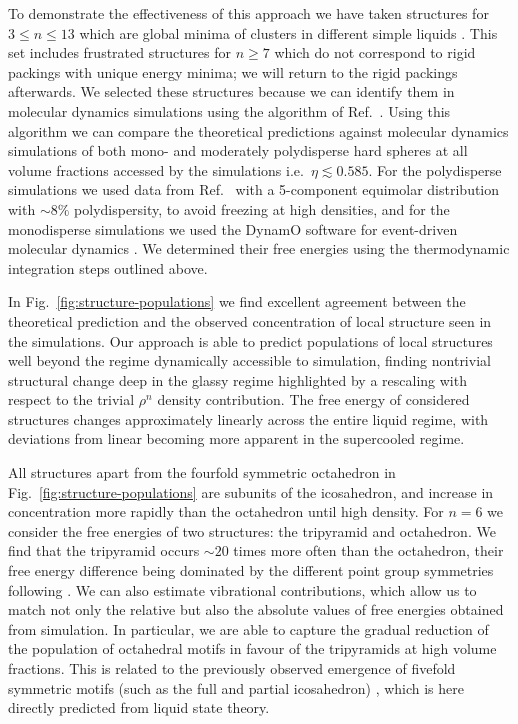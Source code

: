 \documentclass[11pt,twoside]{report}
\begin{document}
To demonstrate the effectiveness of this approach we have taken structures for $3 \le n \le 13$ which are global minima of clusters in different simple liquids \cite{Wales2004}.
This set includes frustrated structures for $n \ge 7$ which do not correspond to rigid packings with unique energy minima; we will return to the rigid packings afterwards.
We selected these structures because we can identify them in molecular dynamics simulations using the algorithm of Ref.\ \cite{MalinsTCC2013}.
Using this algorithm we can compare the theoretical predictions against molecular dynamics simulations of both mono- and moderately polydisperse hard spheres at all volume fractions accessed by the simulations i.e.\ $\eta \lesssim 0.585$.
For the polydisperse simulations we used data from Ref.\ \cite{RoyallJSM2017} with a 5-component equimolar distribution with $\sim8\%$ polydispersity, to avoid freezing at high densities, and for the monodisperse simulations we used the DynamO software for event-driven molecular dynamics \cite{BannermanJCC2011}.
We determined their free energies using the thermodynamic integration steps outlined above.

In Fig.\ \ref{fig:structure-populations} we find excellent agreement between the theoretical prediction and the observed concentration of local structure seen in the simulations.
Our approach is able to predict populations of local structures well beyond the regime dynamically accessible to simulation, finding nontrivial structural change deep in the glassy regime highlighted by a rescaling with respect to the trivial $\rho^n$ density contribution.
The free energy of considered structures changes approximately linearly across the entire liquid regime, with deviations from linear becoming more apparent in the supercooled regime.

All structures apart from the fourfold symmetric octahedron in Fig.\ \ref{fig:structure-populations} are subunits of the icosahedron, and increase in concentration more rapidly than the octahedron until high density.
For $n=6$ we consider the free energies of two structures: the tripyramid and octahedron.
We find that the tripyramid occurs $\sim20$ times more often than the octahedron, their free energy difference being dominated by the different point group symmetries following \cite{MalinsJPCM2009,MengS2010}.
We can also estimate vibrational contributions, which allow us to match not only the relative but also the absolute values of free energies obtained from simulation.
In particular, we are able to capture the gradual reduction of the population of octahedral motifs in favour of the tripyramids at high volume fractions.
This is related to the previously observed emergence of fivefold symmetric motifs (such as the full and partial icosahedron) \cite{RoyallPR2015,TarjusJPCM2005,HallettNC2018,DunleavyNC2015}, which is here directly predicted from liquid state theory.
\end{document}
